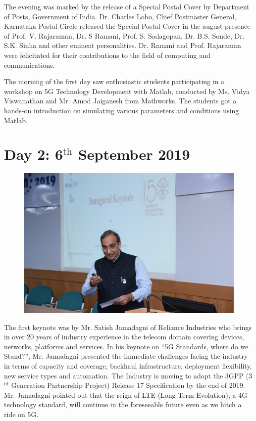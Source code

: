 \begin{multicols}{2}
The evening was marked by the release of a Special Postal Cover by Department of Posts, Government of India. Dr. Charles Lobo, Chief Postmaster General, Karnataka Postal Circle released the Special Postal Cover in the august presence of Prof. V. Rajaraman, Dr. S Ramani, Prof. S. Sadagopan, Dr. B.S. Sonde, Dr. S.K. Sinha and other eminent personalities. Dr. Ramani and Prof. Rajaraman were felicitated for their contributions to the field of computing and communications.

The morning of the first day saw enthusiastic students participating in a workshop on 5G Technology Development with Matlab, conducted by Ms. Vidya Viswanathan and Mr. Amod Jaiganesh from Mathworks. The students got a hands-on introduction on simulating various parameters and conditions using Matlab.

\section*{Day 2: 6$^{\text{th}}$ September 2019}

\begin{figure}[H]
\centering
\includegraphics[scale=.88]{src/Figures/events/event-fig08.jpg}
\vspace{-2ex}
\end{figure}

The first keynote was by Mr. Satish Jamadagni of Reliance Industries who brings in over 20 years of industry experience in the telecom domain covering devices, networks, platforms and services. In his keynote on “5G Standards, where do we Stand?”, Mr. Jamadagni presented the immediate challenges facing the industry in terms of capacity and coverage, backhaul infrastructure, deployment flexibility, new service types and automation. The Industry is moving to adopt the 3GPP (3$^{\text{rd}}$ Generation Partnership Project) Release 17 Specification by the end of 2019. Mr. Jamadagni pointed out that the reign of LTE (Long Term Evolution), a 4G technology standard, will continue in the foreseeable future even as we hitch a ride on 5G.


\end{multicols}
